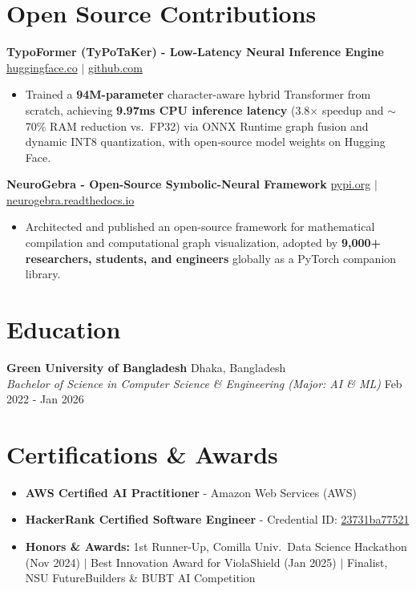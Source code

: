 \documentclass[9.5pt,a4paper]{article}
\begin{document}
\section*{Open Source Contributions}
\noindent
\textbf{TypoFormer (TyPoTaKer) - Low-Latency Neural Inference Engine} \hfill \href{https://huggingface.co/fahiiim/TypoFormer}{huggingface.co} $\vert$ \href{https://github.com/fahiiim/TyPoTaKer}{github.com}
\begin{itemize}
    \item Trained a \textbf{94M-parameter} character-aware hybrid Transformer from scratch, achieving \textbf{9.97ms CPU inference latency} (3.8$\times$ speedup and $\sim$70\% RAM reduction vs.\ FP32) via ONNX Runtime graph fusion and dynamic INT8 quantization, with open-source model weights on Hugging Face.
\end{itemize}
\vspace{0.6pt}
\noindent
\textbf{NeuroGebra - Open-Source Symbolic-Neural Framework} \hfill \href{https://pypi.org/project/neurogebra/}{pypi.org} $\vert$ \href{https://neurogebra.readthedocs.io}{neurogebra.readthedocs.io}
\begin{itemize}
    \item Architected and published an open-source framework for mathematical compilation and computational graph visualization, adopted by \textbf{9,000+ researchers, students, and engineers} globally as a PyTorch companion library.
\end{itemize}
\vspace{0.6pt}

\section*{Education}
\noindent
\textbf{Green University of Bangladesh} \hfill Dhaka, Bangladesh\\
\textit{Bachelor of Science in Computer Science \& Engineering (Major: AI \& ML)} \hfill Feb 2022 - Jan 2026

\section*{Certifications \& Awards}
\begin{itemize}
    \item \textbf{AWS Certified AI Practitioner} - Amazon Web Services (AWS)
    \item \textbf{HackerRank Certified Software Engineer} - Credential ID: \href{https://www.hackerrank.com/certificates/23731ba77521}{23731ba77521}
    \item \textbf{Honors \& Awards:} 1st Runner-Up, Comilla Univ.\ Data Science Hackathon (Nov 2024) $\vert$ Best Innovation Award for ViolaShield (Jan 2025) $\vert$ Finalist, NSU FutureBuilders \& BUBT AI Competition
\end{itemize}
\end{document}
